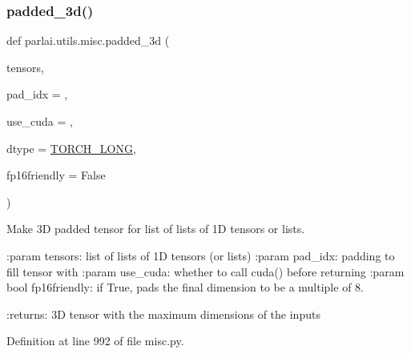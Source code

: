 \subsubsection{\texorpdfstring{padded\+\_\+3d()}{padded\_3d()}}
{\footnotesize\ttfamily def parlai.\+utils.\+misc.\+padded\+\_\+3d (\begin{DoxyParamCaption}\item[{}]{tensors,  }\item[{}]{pad\+\_\+idx = {},  }\item[{}]{use\+\_\+cuda = {},  }\item[{}]{dtype = {\ttfamily \hyperlink{namespaceparlai_1_1utils_1_1misc_ac49ec9bcd5fe586085eb9fab8f40fdb5}{T\+O\+R\+C\+H\+\_\+\+L\+O\+NG}},  }\item[{}]{fp16friendly = {\ttfamily False} }\end{DoxyParamCaption})}

\begin{DoxyVerb}Make 3D padded tensor for list of lists of 1D tensors or lists.

:param tensors:
    list of lists of 1D tensors (or lists)
:param pad_idx:
    padding to fill tensor with
:param use_cuda:
    whether to call cuda() before returning
:param bool fp16friendly:
    if True, pads the final dimension to be a multiple of 8.

:returns:
    3D tensor with the maximum dimensions of the inputs
\end{DoxyVerb}
 

Definition at line 992 of file misc.\+py.


